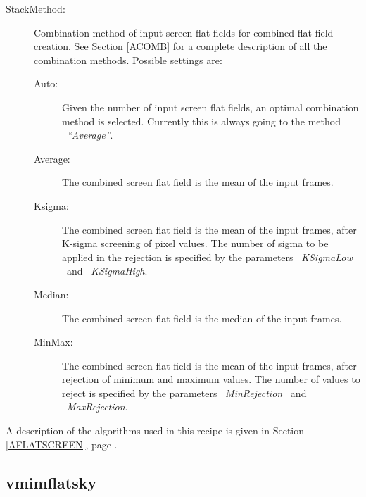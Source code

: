 \begin{description}
\begin{description}
\end{description}

\item [StackMethod:]  Combination method of input screen flat fields for 
                      combined flat field 
                      creation. See Section \ref{ACOMB} for a complete 
                      description of all the combination methods. Possible 
                      settings are:

\begin{description}

  \item [Auto:]     Given the number of input screen flat fields, an optimal 
                    combination method is selected. Currently this is
                    always going to the method \ {\it ``Average''}.

  \item [Average:]  The combined screen flat field is the mean of the 
                    input frames.

  \item [Ksigma:]   The combined screen flat field is the mean of the 
                    input frames, after
                    K-sigma screening of pixel values. The number of sigma 
                    to be applied in the rejection is specified by the 
                    parameters \ {\it KSigmaLow} \ and \ {\it KSigmaHigh}.

  \item [Median:]   The combined screen flat field is the median of the 
                    input frames.

  \item [MinMax:]   The combined screen flat field is the mean of the 
                    input frames, after
                    rejection of minimum and maximum values.
                    The number of values to reject is specified by the 
                    parameters \ {\it MinRejection} \ and \ {\it MaxRejection}.

\end{description}

\end{description}

A description of the algorithms used in this recipe is given in Section
\ref{AFLATSCREEN}, page \pageref{AFLATSCREEN}.

\subsection{vmimflatsky}
\label{sec:UFLATSKY}

